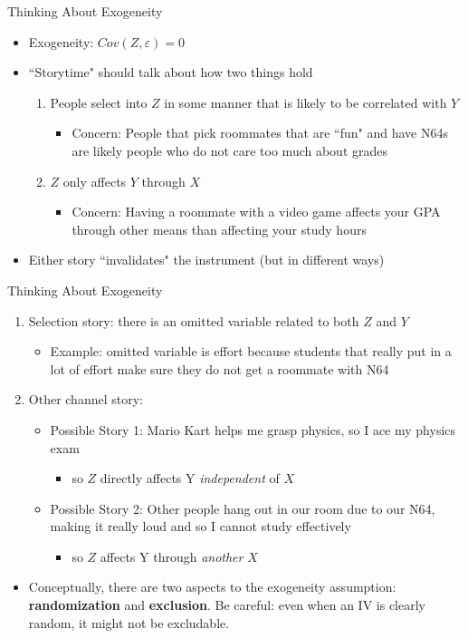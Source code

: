 \documentclass[aspectratio=169,11pt]{beamer}
\begin{document}
\begin{frame}{Thinking About Exogeneity}
\begin{itemize}
\item Exogeneity: $Cov(Z,\varepsilon)= 0$
\medskip
\item ``Storytime" should talk about how two things hold
\begin{enumerate}
\item People select into $Z$ in some manner that is likely to be correlated with $Y$
\begin{itemize}
\item Concern: People that pick roommates that are ``fun" and have N64s are likely people who do not care too much about grades
\end{itemize}
\item $Z$ only affects $Y$ through $X$
\begin{itemize}
\item Concern: Having a roommate with a video game affects your GPA through other means than affecting your study hours
\end{itemize}
\end{enumerate}
\medskip
\item Either story ``invalidates" the instrument (but in different ways)
\end{itemize}
\end{frame}

\begin{frame}{Thinking About Exogeneity}
\begin{enumerate}
\item Selection story: there is an omitted variable related to both $Z$ and $Y$
\begin{itemize}
\item Example: omitted variable is effort because students that really put in a lot of effort make sure they do not get a roommate with N64
\end{itemize}
\medskip
\item Other channel story:
\begin{itemize}
\item Possible Story 1: Mario Kart helps me grasp physics, so I ace my physics exam
\begin{itemize}
\item so $Z$ directly affects Y \emph{independent} of $X$
\end{itemize}
\item Possible Story 2: Other people hang out in our room due to our N64, making it really loud and so I cannot study effectively
\begin{itemize}
\item so $Z$ affects Y through \emph{another} $X$
\end{itemize}
\end{itemize}
\end{enumerate}
\begin{itemize}
\item Conceptually, there are two aspects to the exogeneity assumption: {\bf randomization} and {\bf exclusion}.
Be careful: even when an IV is clearly random, it might not be excludable. 
\end{itemize}
\end{frame}
\end{document}
